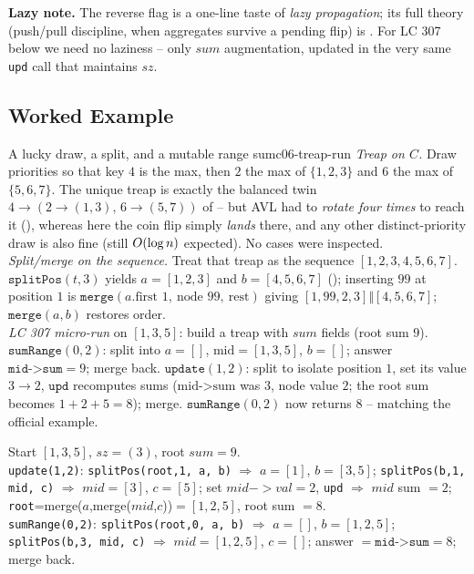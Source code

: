 \noindent\textbf{Lazy note.} The reverse flag is a one-line taste of \emph{lazy propagation}; its full
theory (push/pull discipline, when aggregates survive a pending flip) is . For LC 307 below we
need no laziness -- only $\mathit{sum}$ augmentation, updated in the very same \texttt{upd} call that
maintains $\mathit{sz}$.

\subsection{Worked Example}

\begin{example}{A lucky draw, a split, and a mutable range sum}{c06-treap-run}
\emph{Treap on $C$.} Draw priorities so that key $4$ is the max, then $2$ the max of $\{1,2,3\}$ and $6$
the max of $\{5,6,7\}$. The unique treap is exactly the balanced twin $4\to(2\to(1,3),\,6\to(5,7))$ of
 -- but AVL had to \emph{rotate four times} to reach it (), whereas
here the coin flip simply \emph{lands} there, and any other distinct-priority draw is also fine (still
$O(\log n)$ expected). No cases were inspected.\\
\emph{Split/merge on the sequence.} Treat that treap as the sequence $[1,2,3,4,5,6,7]$.
$\texttt{splitPos}(t,3)$ yields $a=[1,2,3]$ and $b=[4,5,6,7]$ (); inserting $99$ at
position $1$ is $\texttt{merge}(a.\text{first }1,\ \text{node }99,\ \text{rest})$ giving
$[1,99,2,3]\Vert[4,5,6,7]$; $\texttt{merge}(a,b)$ restores order.\\
\emph{LC 307 micro-run} on $[1,3,5]$: build a treap with $\mathit{sum}$ fields (root sum $9$).
$\texttt{sumRange}(0,2)$: split into $a=[]$, $\text{mid}=[1,3,5]$, $b=[]$; answer $\texttt{mid->sum}=9$;
merge back. $\texttt{update}(1,2)$: split to isolate position $1$, set its value $3\to2$, $\texttt{upd}$
recomputes sums ($\text{mid->sum}$ was $3$, node value $2$; the root sum becomes $1+2+5=8$); merge.
$\texttt{sumRange}(0,2)$ now returns $8$ -- matching the official example.
\end{example}

\begin{tracebox}
Start $[1,3,5]$, $\mathit{sz}=(3)$, root $\mathit{sum}=9$.\\
\texttt{update(1,2)}: \texttt{splitPos(root,1, a, b)} $\Rightarrow$ $a=[1]$, $b=[3,5]$;
\texttt{splitPos(b,1, mid, c)} $\Rightarrow$ $mid=[3]$, $c=[5]$; set $mid->val=2$, \texttt{upd}
$\Rightarrow$ $mid$ sum $=2$; \texttt{root}=merge($a$,merge($mid$,$c$))$=[1,2,5]$, root sum $=8$.\\
\texttt{sumRange(0,2)}: \texttt{splitPos(root,0, a, b)} $\Rightarrow$ $a=[]$, $b=[1,2,5]$;
\texttt{splitPos(b,3, mid, c)} $\Rightarrow$ $mid=[1,2,5]$, $c=[]$; answer $=\texttt{mid->sum}=8$;
merge back. \checkmark
\end{tracebox}

